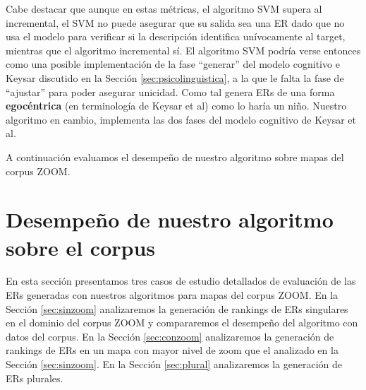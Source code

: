 Cabe destacar que aunque en estas m\'etricas, el algoritmo SVM supera al incremental, el SVM no puede asegurar que su salida sea una ER dado que no usa el modelo para verificar si la descripci\'on identifica un\'ivocamente al target, mientras que el algoritmo incremental s\'i. El algoritmo SVM podr\'ia verse entonces como una posible implementaci\'on de la fase ``generar'' del modelo cognitivo e Keysar \cite{keysar:Curr98} discutido en la Secci\'on \ref{sec:psicolinguistica}, a la que le falta la fase de ``ajustar'' para poder asegurar unicidad. Como tal genera ERs de una forma \textbf{egoc\'entrica} (en terminolog\'ia de Keysar et al) como lo har\'ia un ni\~no. Nuestro algoritmo en cambio, implementa las dos fases del modelo cognitivo de Keysar et al.

A continuaci\'on evaluamos el desempe\~no de nuestro algoritmo sobre mapas del corpus ZOOM.

\section{Desempe\~no de nuestro algoritmo sobre el corpus}
\label{sec:caso_estudio}

En esta secci\'on presentamos tres casos de estudio detallados de evaluaci\'on de las ERs generadas con nuestros algoritmos para mapas del corpus ZOOM. En la Secci\'on \ref{sec:sinzoom} analizaremos la generaci\'on de rankings de ERs singulares en el dominio del corpus ZOOM y compararemos el desempe\~no del algoritmo con datos del corpus. En la Secci\'on \ref{sec:conzoom} analizaremos la generaci\'on de rankings de ERs en un mapa con mayor nivel de zoom que el analizado en la Secci\'on \ref{sec:sinzoom}. En la Secci\'on \ref{sec:plural} analizaremos la generaci\'on de ERs plurales.


%


